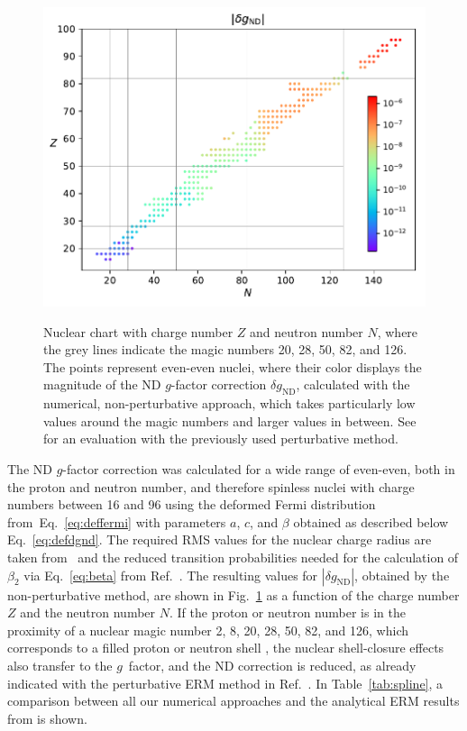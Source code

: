 \begin{figure}
  \centering
  \begin{minipage}[b]{\textwidth}
    \centering
    \includegraphics[width=\textwidth]{pics/dgnuclchart.pdf}\\
    \caption{\label{fig:dg}Nuclear chart with charge number $Z$ and neutron number $N$, where the grey lines indicate the magic numbers 20, 28, 50, 82, and 126. The points represent even-even nuclei, where their color displays the magnitude of the ND $g$-factor correction $\delta g_{\text{ND}}$, calculated with the numerical, non-perturbative approach, which takes particularly low values around the magic numbers and larger values in between. See~\cite{michel2015} for an evaluation with the previously used perturbative method.}
  \end{minipage}
\end{figure}

The ND $g$-factor correction was calculated for a wide range of even-even, both in the proton and neutron number, and therefore spinless nuclei with charge numbers between 16 and 96 using the deformed Fermi distribution from~Eq.~\eqref{eq:deffermi} with parameters $a$, $c$, and $\beta$ obtained as described below Eq.~\eqref{eq:defdgnd}. The required RMS values for the nuclear charge radius are taken from~\cite{Angeli2013} and the reduced transition probabilities needed for the calculation of $\beta_2$ via Eq.~\eqref{eq:beta} from Ref.~\cite{ENSDF}. The resulting values for $|\delta g_{\text{ND}}|$, obtained by the non-perturbative method, are shown in Fig.~\ref{fig:dg} as a function of the charge number $Z$ and the neutron number $N$. If the proton or neutron number is in the proximity of a nuclear magic number 2, 8, 20, 28, 50, 82, and 126, which corresponds to a filled proton or neutron shell \cite{Ring}, the nuclear shell-closure effects also transfer to the $g$~factor, and the ND correction is reduced, as already indicated with the perturbative ERM method in Ref.~\cite{michel2015}. In Table~\ref{tab:spline}, a comparison between all our numerical approaches and the analytical ERM results from \cite{jacek2012} is shown.

